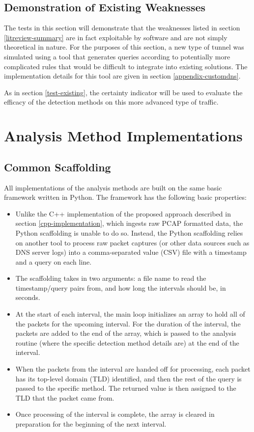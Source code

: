 \documentclass[12pt]{report}
\theoremstyle{remark}
\theoremstyle{definition}
\theoremstyle{definition}
\theoremstyle{definition}
\begin{document}
\subsection{Demonstration of Existing Weaknesses}
\label{test-weakness}
The tests in this section will demonstrate that the weaknesses listed in section
\ref{litreview-summary} are in fact exploitable by software and are not simply
theoretical in nature. For the purposes of this section, a new type of tunnel
was simulated using a tool that generates queries according to potentially more
complicated rules that would be difficult to integrate into existing solutions.
The implementation details for this tool are given in section
\ref{appendix-customdns}.

As in section \ref{test-existing}, the certainty indicator will be used to
evaluate the efficacy of the detection methods on this more advanced type of
traffic.

\section{Analysis Method Implementations}
\subsection{Common Scaffolding}
\label{scaffolding}
All implementations of the analysis methods are built on the same basic
framework written in Python. The framework has the following basic properties:

\begin{itemize} \item Unlike the C++ implementation of the proposed approach
described in section \ref{cpp-implementation}, which ingests raw PCAP formatted
data, the Python scaffolding is unable to do so. Instead, the Python scaffolding
relies on another tool to process raw packet captures (or other data sources
such as DNS server logs) into a comma-separated value (CSV) file with a
timestamp and a query on each line.

\item The scaffolding takes in two arguments: a file name to read the
timestamp/query pairs from, and how long the intervals should be, in seconds.

\item At the start of each interval, the main loop initializes an array to hold
all of the packets for the upcoming interval. For the duration of the interval,
the packets are added to the end of the array, which is passed to the analysis
routine (where the specific detection method details are) at the end of the
interval.

\item When the packets from the interval are handed off for processing, each
packet has its top-level domain (TLD) identified, and then the rest of the query
is passed to the specific method. The returned value is then assigned to the TLD
that the packet came from.

\item Once processing of the interval is complete, the array is cleared in
preparation for the beginning of the next interval.

\end{itemize}
\end{document}
